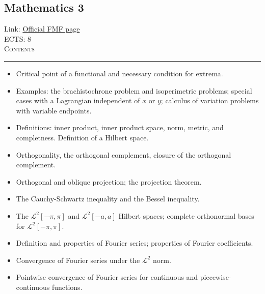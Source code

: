 \documentclass[11pt, a4paper]{article}
\newenvironment{course}[3]{
\subsection{#1}%
Link: \href{#2}{Official FMF page}\\%
ECTS: #3%
\vspace{1ex}
\\
{\large \textsc{Contents}}\\[-0.9ex]%
\rule{\textwidth}{0.5pt}
\vspace{-3ex}
}
{}
\newenvironment{chapter}[1]{
\begin{tcolorbox}[title=#1, breakable]
}
{\end{tcolorbox}}
\begin{document}
\begin{course}{Mathematics 3}{https://www.fmf.uni-lj.si/en/study-physics/programmes/1fiz/2020/7000777/courses/522/}{8}
\begin{chapter}{Calculus of variations}
\begin{itemize}
                \item Critical point of a functional and necessary condition for extrema.

                \item Examples: the brachistochrone problem and isoperimetric problems; special cases with a Lagrangian independent of $ x $ or $ y $; calculus of variation problems with variable endpoints.

                
            \end{itemize}
        \end{chapter}

        \begin{chapter}{Introduction to Hilbert spaces}
            \begin{itemize}
            
                \item Definitions: inner product, inner product space, norm, metric, and completness.
                Definition of a Hilbert space.

                \item Orthogonality, the orthogonal complement, closure of the orthogonal complement.

                \item Orthogonal and oblique projection; the projection theorem.

                \item The Cauchy-Schwartz inequality and the Bessel inequality.

            \end{itemize}

        \end{chapter}

        \begin{chapter}{Introduction to Fourier series}
            \begin{itemize}
            
                \item The $ \mathcal{L}^{2}[-\pi, \pi] $ and $ \mathcal{L}^{2}[-a, a] $ Hilbert spaces; complete orthonormal bases for $ \mathcal{L}^{2}[-\pi, \pi] $.

                \item Definition and properties of Fourier series; properties of Fourier coefficients.

                \item Convergence of Fourier series under the $ \mathcal{L}^{2} $ norm.

                \item Pointwise convergence of Fourier series for continuous and piecewise-continuous functions.
            \end{itemize}
        \end{chapter}
\end{course}
\end{document}
